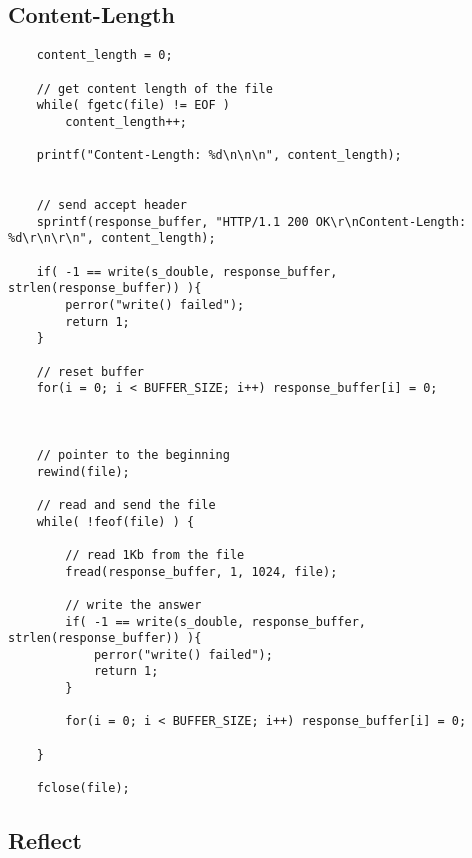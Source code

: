 \newpage\subsection{Content-Length}

\begin{lstlisting}
    content_length = 0;

    // get content length of the file
    while( fgetc(file) != EOF )
        content_length++;

    printf("Content-Length: %d\n\n\n", content_length);


    // send accept header
    sprintf(response_buffer, "HTTP/1.1 200 OK\r\nContent-Length: %d\r\n\r\n", content_length);

    if( -1 == write(s_double, response_buffer, strlen(response_buffer)) ){
        perror("write() failed");
        return 1;
    }

    // reset buffer
    for(i = 0; i < BUFFER_SIZE; i++) response_buffer[i] = 0;



    // pointer to the beginning
    rewind(file);

    // read and send the file
    while( !feof(file) ) {
        
        // read 1Kb from the file
        fread(response_buffer, 1, 1024, file);

        // write the answer
        if( -1 == write(s_double, response_buffer, strlen(response_buffer)) ){
            perror("write() failed");
            return 1;
        }

        for(i = 0; i < BUFFER_SIZE; i++) response_buffer[i] = 0;

    }

    fclose(file);
\end{lstlisting}


\newpage\subsection{Reflect}

